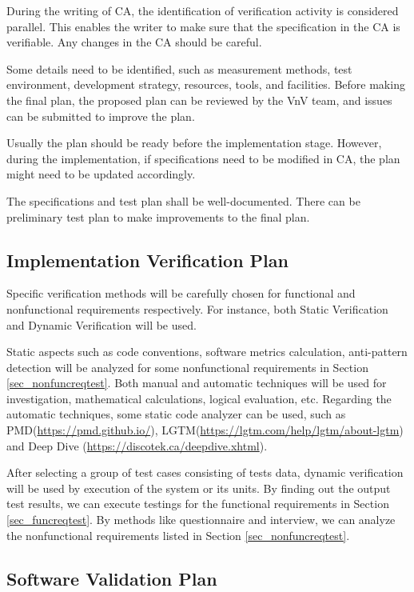 \documentclass[12pt, titlepage]{article}
\begin{document}
During the writing of CA, the identification of verification activity is
considered parallel. This enables the writer to make sure that the specification
in the CA is verifiable. Any changes in the CA should be careful.

Some details need to be identified, such as measurement methods, test
environment, development strategy, resources, tools, and facilities. Before
making the final plan, the proposed plan can be reviewed by the VnV team, and
issues can be submitted to improve the plan.

Usually the plan should be ready before the implementation stage. However,
during the implementation, if specifications need to be modified in CA, the plan
might need to be updated accordingly.

The specifications and test plan shall be well-documented. There can be
preliminary test plan to make improvements to the final plan.

\subsection{Implementation Verification Plan} Specific verification methods will
be carefully chosen for functional and nonfunctional requirements
respectively. For instance, both Static Verification and Dynamic Verification
will be used.
    
    Static aspects such as code conventions, software metrics calculation,
anti-pattern detection will be analyzed for some nonfunctional requirements in
Section \ref{sec_nonfuncreqtest}. Both manual and automatic techniques will be
used for investigation, mathematical calculations, logical evaluation,
etc. Regarding the automatic techniques, some static code analyzer can be used,
such as PMD(\url{https://pmd.github.io/}),
LGTM(\url{https://lgtm.com/help/lgtm/about-lgtm}) and Deep Dive
(\url{https://discotek.ca/deepdive.xhtml}).
    
    After selecting a group of test cases consisting of tests data, dynamic
verification will be used by execution of the system or its units. By finding
out the output test results, we can execute testings for the functional
requirements in Section \ref{sec_funcreqtest}. By methods like questionnaire and
interview, we can analyze the nonfunctional requirements listed in Section
\ref{sec_nonfuncreqtest}.
        
\subsection{Software Validation Plan}
\end{document}
